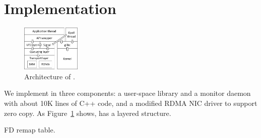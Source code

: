 \section{Implementation}
\label{sec:implementation}

\begin{figure}[t!]
	\centering
	\includegraphics[width=0.25\textwidth]{images/libsd_architecture}
	\vspace{-5pt}
	\caption{Architecture of \libipc{}.}
	\label{fig:libsd-architecture}
\end{figure}


We implement \sys in three components: a user-space library \libipc{} and a monitor daemon with about 10K lines of C++ code, and a modified RDMA NIC driver to support zero copy.
As Figure~\ref{fig:libsd-architecture} shows, \libipc{} has a layered structure.


FD remap table.







